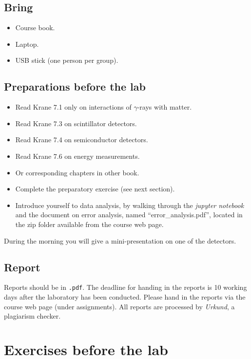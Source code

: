 \documentclass[12pt]{article}
\begin{document}
\subsection*{Bring}
\begin{itemize}
  \item Course book.
  \item Laptop.
  \item USB stick (one person per group).
\end{itemize}


\subsection*{Preparations before the lab}
\begin{itemize}
  \item Read Krane 7.1 only on interactions of $\gamma$-rays with matter. %
  \item Read Krane 7.3 on scintillator detectors.
  \item Read Krane 7.4 on semiconductor detectors.
  \item Read Krane 7.6 on energy measurements.
  \item Or corresponding chapters in other book.
  \item Complete the preparatory exercise (see next section).
  \item Introduce yourself to data analysis, by walking through the {\it jupyter notebook} and the document on error analysis, named ``error\_analysis.pdf'', located in the zip folder available from the course web page.

\end{itemize}
During the morning you will give a mini-presentation on one of the detectors.

\subsection*{Report}
Reports should be in \texttt{.pdf}. The deadline for handing in the
reports is 10 working days after the laboratory has been conducted.
Please hand in the reports via the course web page (under assignments).
All reports are processed by \textit{Urkund}, a plagiarism checker.


\section*{Exercises before the lab} \label{sec:exe}
\end{document}
